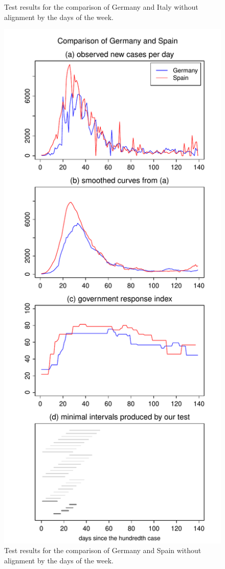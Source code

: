 \documentclass[a4paper,12pt]{article}
\numberwithin{equation}{section}
\begin{document}
\begin{figure}[h!]
\begin{minipage}[t]{0.49\textwidth}
\caption{Test results for the comparison of Germany and Italy without alignment by the days of the week.}
\end{minipage}
\hspace{0.25cm}
\begin{minipage}[t]{0.49\textwidth}
\includegraphics[width=\textwidth]{plots/DEU_vs_ESP}
\caption{Test results for the comparison of Germany and Spain without alignment by the days of the week.}
\end{minipage}
\end{figure}
\end{document}
